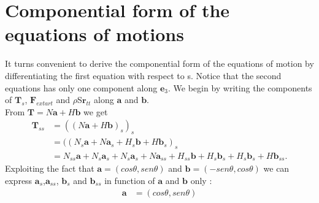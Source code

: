 

\section{Componential form of the equations of motions}\label{componential-form-of-the-equations-of-motion}
It turns convenient to derive the componential form of the equations of motion by differentiating the first equation with respect to s.
Notice that the second equations has only one component along $\mathbf{e}_3$.
We begin by writing the components of $\mathbf{T}_s$, $\mathbf{F}_{extart}$ and $\rho$S$\mathbf{r}_{tt}$ along $\mathbf{a}$ and $\mathbf{b}$.\\
From $\mathbf{T}=N\mathbf{a}+H\mathbf{b}$ we get
\begin{equation}
\begin{split}
\mathbf{T}_{ss}& =((N\mathbf{a}+H\mathbf{b})_s)_s\\
               & =((N_s\mathbf{a}+ N\mathbf{a}_s + H_s\mathbf{b} + H\mathbf{b}_s)_s\\
               & = N_{ss}\mathbf{a} + N_s\mathbf{a}_s + N_s\mathbf{a}_s + N\mathbf{a}_{ss} + H_{ss}\mathbf{b} + H_s\mathbf{b}_s + H_s\mathbf{b}_s + H\mathbf{b}_{ss}.
\end{split}
\end{equation}
Exploiting the fact that $\mathbf{a}=(cos\theta, sen\theta)$ and $\mathbf{b}=(-sen\theta, cos\theta)$ we can express $\mathbf{a}_s$,$\mathbf{a}_{ss}$, $\mathbf{b}_s$ and $\mathbf{b}_{ss}$ in function of $\mathbf{a}$ and $\mathbf{b}$ only :
\begin{equation}
\begin{split}
\mathbf{a}& = (cos\theta, sen\theta)
\end{split}
\end{equation}


 
 
 
 
 
 
  
  
  
  
  
  
  
  
  